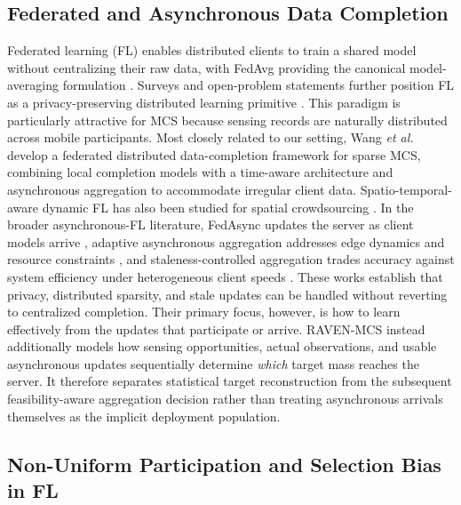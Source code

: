 \documentclass[letterpaper,journal]{IEEEtran}
\begin{document}
\subsection{Federated and Asynchronous Data Completion}

Federated learning (FL) enables distributed clients to train a shared model
without centralizing their raw data, with FedAvg providing the canonical
model-averaging formulation \cite{mcmahan2017communication,yang2019federated}.
Surveys and open-problem statements further position FL as a privacy-preserving
distributed learning primitive
\cite{kairouz2021advances,li2020federated}.  This paradigm is
particularly attractive for MCS because sensing records are naturally
distributed across mobile participants.  Most closely related to our setting,
Wang \emph{et al.}~\cite{wang2026federated} develop a federated distributed
data-completion framework for sparse MCS, combining local completion models
with a time-aware architecture and asynchronous aggregation to accommodate
irregular client data.  Spatio-temporal-aware dynamic FL has also been studied
for spatial crowdsourcing \cite{li2026stdfl}.  In the broader asynchronous-FL
literature, FedAsync updates the server as client models arrive
\cite{xie2019asynchronous}, adaptive asynchronous aggregation addresses edge
dynamics and resource constraints \cite{liu2023adaptive}, and
staleness-controlled aggregation trades accuracy against system
efficiency under heterogeneous client speeds \cite{sun2024staleness}.  These
works establish that privacy, distributed sparsity, and stale updates can be
handled without reverting to centralized completion.  Their primary focus,
however, is how to learn effectively from the updates that participate or
arrive.  RAVEN-MCS instead additionally models how sensing opportunities,
actual observations, and usable asynchronous updates sequentially determine
\emph{which} target mass reaches the server.  It therefore separates
statistical target reconstruction from the subsequent feasibility-aware
aggregation decision rather than treating asynchronous arrivals themselves as
the implicit deployment population.

\subsection{Non-Uniform Participation and Selection Bias in FL}
\end{document}
